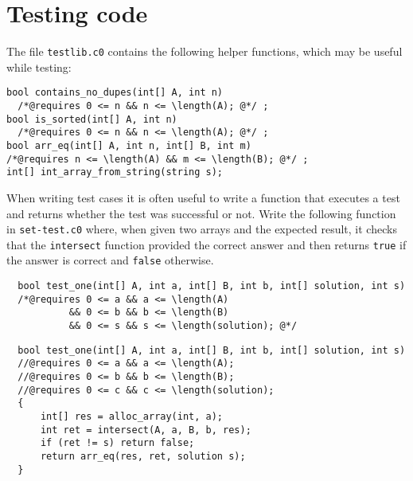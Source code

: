 \section*{Testing code}

The file \lstinline'testlib.c0' contains the following helper
functions, which may be useful while testing:
\begin{lstlisting}[belowskip=0pt]
bool contains_no_dupes(int[] A, int n)
  /*@requires 0 <= n && n <= \length(A); @*/ ;
bool is_sorted(int[] A, int n)
  /*@requires 0 <= n && n <= \length(A); @*/ ;
bool arr_eq(int[] A, int n, int[] B, int m)
/*@requires n <= \length(A) && m <= \length(B); @*/ ;
int[] int_array_from_string(string s);
\end{lstlisting}


\begin{part}
  When writing test cases it is often useful to write a function that
  executes a test and returns whether the test was successful or not.
  Write the following function in \lstinline'set-test.c0' where, when
  given two arrays and the expected result, it checks that the
  \lstinline'intersect' function provided the correct answer and then
  returns \lstinline'true' if the answer is correct and
  \lstinline'false' otherwise.
\begin{lstlisting}
  bool test_one(int[] A, int a, int[] B, int b, int[] solution, int s)
  /*@requires 0 <= a && a <= \length(A)
           && 0 <= b && b <= \length(B)
           && 0 <= s && s <= \length(solution); @*/
\end{lstlisting}
\begin{solution}
\begin{lstlisting}
  bool test_one(int[] A, int a, int[] B, int b, int[] solution, int s)
  //@requires 0 <= a && a <= \length(A);
  //@requires 0 <= b && b <= \length(B);
  //@requires 0 <= c && c <= \length(solution);
  {
      int[] res = alloc_array(int, a);
      int ret = intersect(A, a, B, b, res);
      if (ret != s) return false;
      return arr_eq(res, ret, solution s);
  }
\end{lstlisting}
\end{solution}
\end{part}

